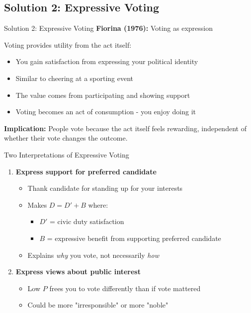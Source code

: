 \documentclass[10pt]{beamer}
\begin{document}
\subsection{Solution 2: Expressive Voting}

\begin{frame}{Solution 2: Expressive Voting}
\textbf{Fiorina (1976):} Voting as expression

Voting provides utility from the act itself:
\begin{itemize}
\item You gain satisfaction from expressing your political identity
\item Similar to cheering at a sporting event
\item The value comes from participating and showing support
\item Voting becomes an act of consumption - you enjoy doing it
\end{itemize}


\textbf{Implication:} People vote because the act itself feels rewarding, independent of whether their vote changes the outcome.
\end{frame}

\begin{frame}{Two Interpretations of Expressive Voting}
\begin{enumerate}
\item \textbf{Express support for preferred candidate}
\begin{itemize}
\item Thank candidate for standing up for your interests
\item Makes $D = D' + B$ where:
\begin{itemize}
\item $D'$ = civic duty satisfaction
\item $B$ = expressive benefit from supporting preferred candidate
\end{itemize}
\item Explains \emph{why} you vote, not necessarily \emph{how}
\end{itemize}



\item \textbf{Express views about public interest}
\begin{itemize}
\item Low $P$ frees you to vote differently than if vote mattered
\item Could be more "irresponsible" or more "noble"
\end{itemize}
\end{enumerate}
\end{frame}
\end{document}
